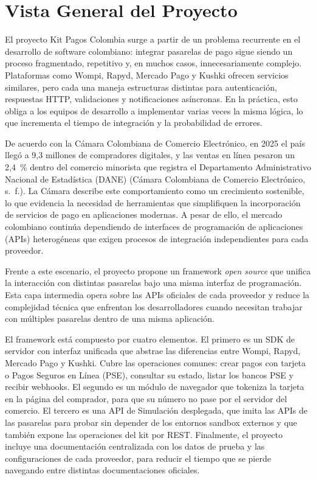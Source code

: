 \section{Vista General del Proyecto}

El proyecto Kit Pagos Colombia surge a partir de un problema recurrente en el desarrollo de software colombiano: integrar pasarelas de pago sigue siendo un proceso fragmentado, repetitivo y, en muchos casos, innecesariamente complejo. Plataformas como Wompi, Rapyd, Mercado Pago y Kushki ofrecen servicios similares, pero cada una maneja estructuras distintas para autenticación, respuestas HTTP, validaciones y notificaciones asíncronas. En la práctica, esto obliga a los equipos de desarrollo a implementar varias veces la misma lógica, lo que incrementa el tiempo de integración y la probabilidad de errores.

De acuerdo con la Cámara Colombiana de Comercio Electrónico, en 2025 el país llegó a 9,3 millones de compradores digitales, y las ventas en línea pesaron un 2,4~\% dentro del comercio minorista que registra el Departamento Administrativo Nacional de Estadística (DANE) (Cámara Colombiana de Comercio Electrónico, s.~f.). La Cámara describe este comportamiento como un crecimiento sostenible, lo que evidencia la necesidad de herramientas que simplifiquen la incorporación de servicios de pago en aplicaciones modernas. A pesar de ello, el mercado colombiano continúa dependiendo de interfaces de programación de aplicaciones (APIs) heterogéneas que exigen procesos de integración independientes para cada proveedor.

Frente a este escenario, el proyecto propone un framework \textit{open source} que unifica la interacción con distintas pasarelas bajo una misma interfaz de programación. Esta capa intermedia opera sobre las APIs oficiales de cada proveedor y reduce la complejidad técnica que enfrentan los desarrolladores cuando necesitan trabajar con múltiples pasarelas dentro de una misma aplicación.

El framework está compuesto por cuatro elementos. El primero es un SDK de servidor con interfaz unificada que abstrae las diferencias entre Wompi, Rapyd, Mercado Pago y Kushki. Cubre las operaciones comunes: crear pagos con tarjeta o Pagos Seguros en Línea (PSE), consultar su estado, listar los bancos PSE y recibir webhooks. El segundo es un módulo de navegador que tokeniza la tarjeta en la página del comprador, para que su número no pase por el servidor del comercio. El tercero es una API de Simulación desplegada, que imita las APIs de las pasarelas para probar sin depender de los entornos sandbox externos y que también expone las operaciones del kit por REST. Finalmente, el proyecto incluye una documentación centralizada con los datos de prueba y las configuraciones de cada proveedor, para reducir el tiempo que se pierde navegando entre distintas documentaciones oficiales.

